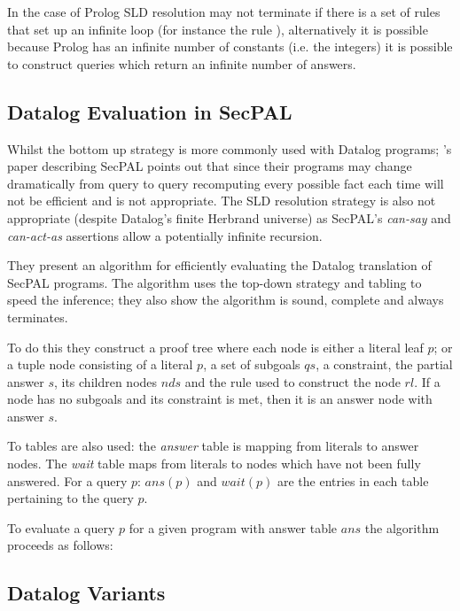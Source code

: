 \documentclass[a4paper,sfsidenotes]{tufte-book}
\begin{document}
In the case of Prolog \ac{SLD} resolution may
not terminate if there is a set of rules that set up an infinite loop (for
instance the rule ),
alternatively it is possible because Prolog has an infinite number of constants
(i.e. the integers) it is possible to construct queries which return an infinite
number of answers.

\subsection{Datalog Evaluation in SecPAL}

Whilst the bottom up strategy is more commonly used with Datalog programs;
\citeauthor*{Becker:2009vt}'s paper describing SecPAL\cite{Becker:2010vh} points out that since
their programs may change dramatically from query to query recomputing every
possible fact each time  will not be efficient and is not appropriate.  The
\ac{SLD} resolution strategy is also not appropriate (despite Datalog's finite
Herbrand universe) as SecPAL's \emph{can-say} and \emph{can-act-as} assertions
allow a potentially infinite recursion.

They present an algorithm for efficiently evaluating the Datalog translation of
SecPAL programs.  The algorithm uses the top-down strategy and tabling to speed
the inference; they also show the algorithm is sound, complete and always
terminates. 

To do this they construct a proof tree where each node is either a literal leaf
$p$; or a tuple node consisting of a literal $p$, a set of subgoals $qs$, a
constraint, the partial answer $s$, its children nodes $nds$ and the rule used
to construct the node $rl$.  If a node has no subgoals and its constraint
is met, then it is an answer node with answer $s$.

To tables are also used: the \emph{answer} table is mapping from literals to
answer nodes.  The \emph{wait} table maps from literals to nodes which
have not been fully answered.  For a query $p$: $ans(p)$ and $wait(p)$ are the
entries in each table pertaining to the query $p$.

To evaluate a query $p$ for a given program with answer table $ans$ the
algorithm proceeds as follows:

\begin{algorithm}
  \Fn
\end{algorithm}


\subsection{Datalog Variants}
\end{document}
